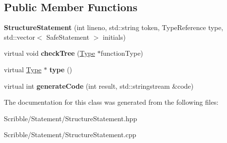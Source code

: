 \subsection*{Public Member Functions}
\begin{DoxyCompactItemize}
\item 
\hypertarget{class_structure_statement_ae94c88cab424374345b1a34909e2b346}{{\bfseries Structure\-Statement} (int lineno, std\-::string token, Type\-Reference type, std\-::vector$<$ Safe\-Statement $>$ initials)}\label{class_structure_statement_ae94c88cab424374345b1a34909e2b346}

\item 
\hypertarget{class_structure_statement_aeb6a336093f4167df467dd2de4af3fde}{virtual void {\bfseries check\-Tree} (\hyperlink{class_type}{Type} $\ast$function\-Type)}\label{class_structure_statement_aeb6a336093f4167df467dd2de4af3fde}

\item 
\hypertarget{class_structure_statement_a358491cbc441f16194fa95d7dd91c1ea}{virtual \hyperlink{class_type}{Type} $\ast$ {\bfseries type} ()}\label{class_structure_statement_a358491cbc441f16194fa95d7dd91c1ea}

\item 
\hypertarget{class_structure_statement_ad0ea330ed8191bbbaeb17366005d077a}{virtual int {\bfseries generate\-Code} (int result, std\-::stringstream \&code)}\label{class_structure_statement_ad0ea330ed8191bbbaeb17366005d077a}

\end{DoxyCompactItemize}


The documentation for this class was generated from the following files\-:\begin{DoxyCompactItemize}
\item 
Scribble/\-Statement/Structure\-Statement.\-hpp\item 
Scribble/\-Statement/Structure\-Statement.\-cpp\end{DoxyCompactItemize}
